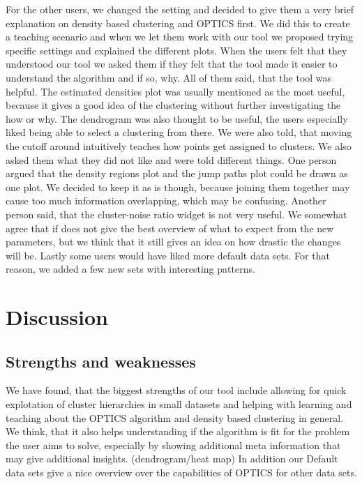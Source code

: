 \documentclass{vgtc} %
\begin{document}
For the other users, we changed the setting and decided to give them a very brief explanation on density based clustering and OPTICS first. We did this to create a teaching scenario and when we let them work with our tool we proposed trying specific settings and explained the different plots. When the users felt that they understood our tool we asked them if they felt that the tool made it easier to understand the algorithm and if so, why. All of them said, that the tool was helpful. The estimated densities plot was usually mentioned as the most useful, because it gives a good idea of the clustering without further investigating the how or why. The dendrogram was also thought to be useful, the users especially liked being able to select a clustering from there. We were also told, that moving the cutoff around intuitively teaches how points get assigned to clusters. We also asked them what they did not like and were told different things. One person argued that the density regions plot and the jump paths plot could be drawn as one plot. We decided to keep it as is though, because joining them together may cause too much information overlapping, which may be confusing. Another person said, that the cluster-noise ratio widget is not very useful. We somewhat agree that if does not give the best overview of what to expect from the new parameters, but we think that it still gives an idea on how drastic the changes will be. Lastly some users would have liked more default data sets. For that reason, we added a few new sets with interesting patterns.

\section{Discussion}

\subsection{Strengths and weaknesses}
We have found, that the biggest strengths of our tool include allowing for quick explotation of cluster hierarchies in small datasets and helping with learning and teaching about the OPTICS algorithm and density based clustering in general. We think, that it also helps understanding if the algorithm is fit for the problem the user aims to solve, especially by showing additional meta information that may give additional insights. (dendrogram/heat map) In addition our Default data sets give a nice overview over the capabilities of OPTICS for other data sets.
\end{document}
